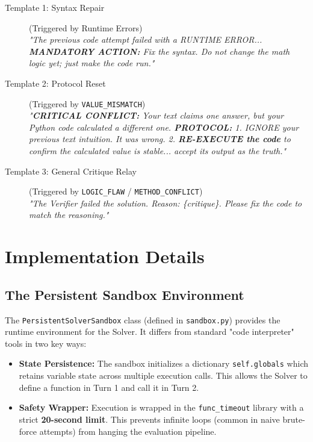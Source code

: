 \documentclass{article}
\begin{document}
\begin{description}
    \item[Template 1: Syntax Repair] (Triggered by Runtime Errors) \\
    \textit{"The previous code attempt failed with a RUNTIME ERROR... \textbf{MANDATORY ACTION:} Fix the syntax. Do not change the math logic yet; just make the code run."}
    
    \item[Template 2: Protocol Reset] (Triggered by \texttt{VALUE\_MISMATCH}) \\
    \textit{"\textbf{CRITICAL CONFLICT:} Your text claims one answer, but your Python code calculated a different one. \textbf{PROTOCOL:} 1. IGNORE your previous text intuition. It was wrong. 2. \textbf{RE-EXECUTE the code} to confirm the calculated value is stable... accept its output as the truth."}
    
    \item[Template 3: General Critique Relay] (Triggered by \texttt{LOGIC\_FLAW} / \texttt{METHOD\_CONFLICT}) \\
    \textit{"The Verifier failed the solution. Reason: \{critique\}. Please fix the code to match the reasoning."}
\end{description}

\section{Implementation Details}
\label{app:impl}

\subsection{The Persistent Sandbox Environment}
The \texttt{PersistentSolverSandbox} class (defined in \texttt{sandbox.py}) provides the runtime environment for the Solver. It differs from standard "code interpreter" tools in two key ways:

\begin{itemize}
    \item \textbf{State Persistence:} The sandbox initializes a dictionary \texttt{self.globals} which retains variable state across multiple execution calls. This allows the Solver to define a function in Turn 1 and call it in Turn 2.
    \item \textbf{Safety Wrapper:} Execution is wrapped in the \texttt{func\_timeout} library with a strict \textbf{20-second limit}. This prevents infinite loops (common in naive brute-force attempts) from hanging the evaluation pipeline.
\end{itemize}
\end{document}

